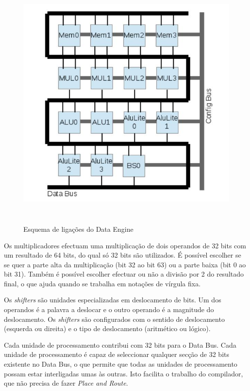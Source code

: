 \begin{figure}[!htb]
  \centering
  \includegraphics[height=130mm]{Figures/DataEngine.jpg}
  \caption[Esquema de ligações do Data Engine]{Esquema de ligações do Data Engine}  
  \label{fig:Esquema_ligacoes_DataEngine}
\end{figure}

Os multiplicadores efectuam uma multiplicação de dois operandos de 32 bits com um resultado de 64 bits, do qual só 32 bits são utilizados. É possível escolher se se quer a parte alta da multiplicação (bit 32 ao bit 63) ou a parte baixa (bit 0 ao bit 31). Também é possível escolher efectuar ou não a divisão por 2 do resultado final, o que ajuda quando se trabalha em notações de vírgula fixa.

Os {\it shifters} são unidades especializadas em deslocamento de bits. Um dos operandos é a palavra a deslocar e o outro operando é a magnitude do deslocamento. Os {\it shifters} são configurados com o sentido de deslocamento (esquerda ou direita) e o tipo de deslocamento (aritmético ou lógico).

Cada unidade de processamento contribui com 32 bits para o Data Bus. Cada unidade de processamento é capaz de seleccionar qualquer secção de 32 bits existente no Data Bus, o que permite que todas as unidades de processamento possam estar interligadas umas às outras. Isto facilita o trabalho do compilador, que não precisa de fazer {\it Place and Route}. 

